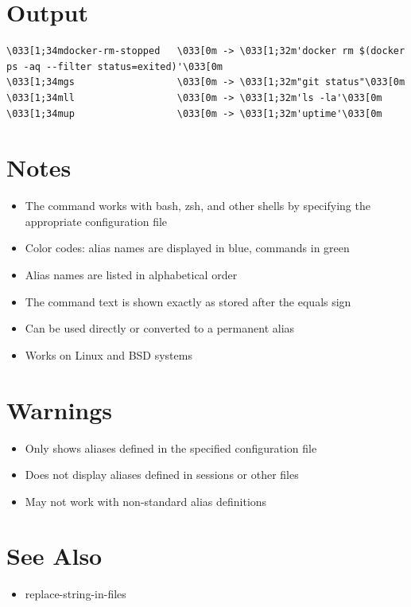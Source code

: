 \documentclass{article}
\begin{document}
\section*{Output}
\begin{lstlisting}
\033[1;34mdocker-rm-stopped   \033[0m -> \033[1;32m'docker rm $(docker ps -aq --filter status=exited)'\033[0m
\033[1;34mgs                  \033[0m -> \033[1;32m"git status"\033[0m
\033[1;34mll                  \033[0m -> \033[1;32m'ls -la'\033[0m
\033[1;34mup                  \033[0m -> \033[1;32m'uptime'\033[0m
\end{lstlisting}

\section*{Notes}
\begin{itemize}
  \item The command works with bash, zsh, and other shells by specifying the appropriate configuration file
  \item Color codes: alias names are displayed in blue, commands in green
  \item Alias names are listed in alphabetical order
  \item The command text is shown exactly as stored after the equals sign
  \item Can be used directly or converted to a permanent alias
  \item Works on Linux and BSD systems
\end{itemize}

\section*{Warnings}
\begin{itemize}
  \item Only shows aliases defined in the specified configuration file
  \item Does not display aliases defined in sessions or other files
  \item May not work with non-standard alias definitions
\end{itemize}

\section*{See Also}
\begin{itemize}
  \item replace-string-in-files
\end{itemize}
\end{document}
